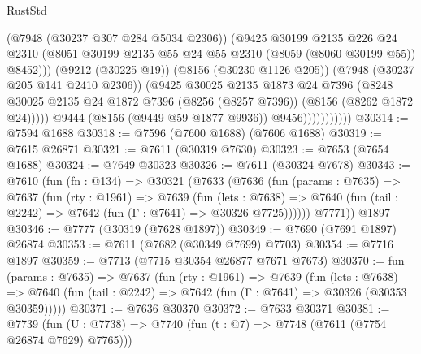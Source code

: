 \begin{lexlean}{RustStd}
\begin{coremodule}
                              (@7948 (@30237 @307 @284 @5034 @2306))
                              (@9425
                                @30199
                                @2135
                                @226
                                @24
                                @2310
                                (@8051
                                  @30199
                                  @2135
                                  @55
                                  @24
                                  @55
                                  @2310
                                  (@8059 (@8060 @30199 @55))
                                  @8452)))
                            (@9212 (@30225 @19))
                            (@8156 (@30230 @1126 @205))
                            (@7948 (@30237 @205 @141 @2410 @2306))
                            (@9425
                              @30025
                              @2135
                              @1873
                              @24
                              @7396
                              (@8248
                                @30025
                                @2135
                                @24
                                @1872
                                @7396
                                (@8256 (@8257 @7396))
                                (@8156 (@8262 @1872 @24)))))
                          @9444
                          (@8156 (@9449 @59 @1877 @9936))
                          @9456)))))))))))
@30314 := @7594 @1688
@30318 := @7596 (@7600 @1688) (@7606 @1688)
@30319 := @7615 @26871
@30321 := @7611 (@30319 @7630)
@30323 := @7653 (@7654 @1688)
@30324 := @7649 @30323
@30326 := @7611 (@30324 @7678)
@30343 := @7610
    (fun (fn : @134) =>
    @30321
      (@7633
        (@7636
          (fun (params : @7635) =>
          @7637
            (fun (rty : @1961) =>
            @7639
              (fun (lets : @7638) =>
              @7640 (fun (tail : @2242) => @7642 (fun (Γ : @7641) => @30326 @7725))))))
        @7771))
    @1897
@30346 := @7777 (@30319 (@7628 @1897))
@30349 := @7690 (@7691 @1897) @26874
@30353 := @7611 (@7682 (@30349 @7699) @7703)
@30354 := @7716 @1897
@30359 := @7713 (@7715 @30354 @26877 @7671 @7673)
@30370 := fun (params : @7635) =>
  @7637
    (fun (rty : @1961) =>
    @7639
      (fun (lets : @7638) =>
      @7640 (fun (tail : @2242) => @7642 (fun (Γ : @7641) => @30326 (@30353 @30359)))))
@30371 := @7636 @30370
@30372 := @7633 @30371
@30381 := @7739
    (fun (U : @7738) => @7740 (fun (t : @7) => @7748 (@7611 (@7754 @26874 @7629) @7765)))

\end{coremodule}
\end{lexlean}
